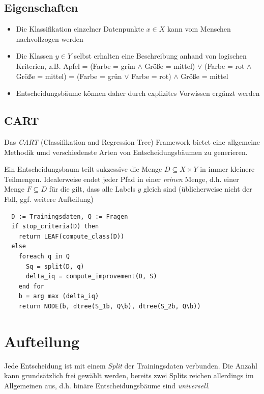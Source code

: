 \documentclass{report}
\begin{document}
\subsection{Eigenschaften}

\begin{itemize}
  \item Die Klassifikation einzelner Datenpunkte $x\in X$ kann vom Menschen nachvollzogen werden
  \item Die Klassen $y\in Y$ selbst erhalten eine Beschreibung anhand von logischen Kriterien, z.B.
  \subitem Apfel = (Farbe = grün $\land$ Größe = mittel) $\lor$ (Farbe = rot $\land$ Größe = mittel)
  = (Farbe = grün $\lor$ Farbe = rot) $\land$ Größe = mittel
  \item Entscheidungsbäume können daher durch explizites Vorwissen ergänzt werden
\end{itemize}

\subsection{CART}

Das \textit{CART} (Classifikation and Regression Tree) Framework bietet eine allgemeine Methodik umd
verschiedenste Arten von Entscheidungsbäumen zu generieren.\par
Ein Entscheidungsbaum teilt sukzessive die Menge $D \subseteq X \times Y$ in immer kleinere Teilmengen.
Idealerweise endet jeder Pfad in einer \textit{reinen} Menge, d.h. einer Menge $F \subseteq D$ für die gilt,
dass alle Labels $y$ gleich sind (üblicherweise nicht der Fall, ggf. weitere Aufteilung)

\begin{lstlisting}
  D := Trainingsdaten, Q := Fragen
  if stop_criteria(D) then
    return LEAF(compute_class(D))
  else
    foreach q in Q
      Sq = split(D, q)
      delta_iq = compute_improvement(D, S)
    end for
    b = arg max (delta_iq)
    return NODE(b, dtree(S_1b, Q\b), dtree(S_2b, Q\b))
\end{lstlisting}

\section{Aufteilung}

Jede Entscheidung ist mit einem \textit{Split} der Trainingsdaten verbunden. Die Anzahl kann grundsätzlich frei
gewählt werden, bereits zwei Splits reichen allerdings im Allgemeinen aus, d.h. binäre Entscheidungsbäume sind \textit{universell}.
\end{document}
